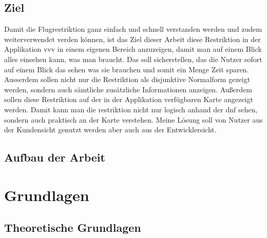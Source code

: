 \documentclass[a4paper,12pt]{article}
\begin{document}
\subsection{Ziel}
Damit die Flugrestriktion ganz einfach und schnell verstanden werden und zudem weiterverwendet verden können, ist das Ziel dieser Arbeit diese Restriktion in der Applikation vvv in einem eigenen Bereich anzuzeigen, damit man auf einem Blick alles einsehen kann, was man braucht. Das soll sicherstellen, das die Nutzer sofort auf einem Blick das sehen was sie brauchen und somit ein Menge Zeit sparen. Ausserdem sollen nicht nur die Restriktion als disjunktive Normalform gezeigt werden, sondern auch sämtliche zusätzliche Informationen anzeigen. Außerdem sollen diese Restriktion auf der in der Applikation verfügbaren Karte angezeigt werden. Damit kann man die restriktion nicht nur logisch anhand der dnf sehen, sondern auch praktisch an der Karte verstehen.  Meine Lösung soll von Nutzer aus der Kundensicht genutzt werden aber auch aus der Entwicklersicht.
\subsection{Aufbau der Arbeit}
\newpage
\section{Grundlagen}
\subsection{Theoretische Grundlagen}
\end{document}
